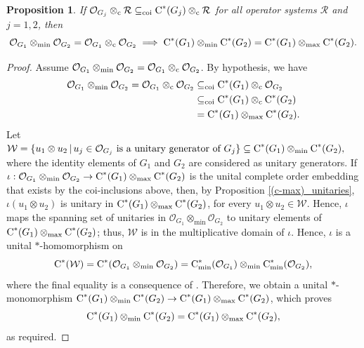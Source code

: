 \documentclass{amsart}
\newtheorem{proposition}[theorem]{Proposition}
\theoremstyle{definition}
\theoremstyle{remark}
\newcommand\omin{\otimes_{\textrm{min}}}
\newcommand\cstar{{\textrm C}^*}                              %
\newcommand\cstare{{\textrm C}_{\textrm{min}}^*}              %
\numberwithin{equation}{section}
\begin{document}
\begin{proposition}\label{rdci-(min,max)}
	If $\mathcal O_{G_j}\otimes_{\textrm c}\mathcal R\subseteq_{\textrm{coi}}\cstar(G_j)\otimes_{\textrm c}\mathcal R$ for all operator systems $\mathcal R$ and $j=1,2$, then $$\mathcal O_{G_1}\otimes_{\textrm{min}}\mathcal O_{G_2}=\mathcal O_{G_1}\otimes_{\textrm c}\mathcal O_{G_2}\implies \cstar(G_1)\otimes_{\textrm{min}}\cstar(G_2)=\cstar(G_1)\otimes_{\textrm{max}}\cstar(G_2).$$
\end{proposition}
\begin{proof}
	Assume $\mathcal O_{G_1}\otimes_{\textrm{min}}\mathcal O_{G_2}=\mathcal O_{G_1}\otimes_{\textrm c}\mathcal O_{G_2}$.  By hypothesis, we have \begin{align*}
		\mathcal O_{G_1}\otimes_{\textrm{min}}\mathcal O_{G_2}=\mathcal O_{G_1}\otimes_{\textrm c}\mathcal O_{G_2}&\subseteq_{\textrm{coi}} \cstar(G_1)\otimes_{\textrm c}\mathcal O_{G_2}\\
		&\subseteq_{\textrm{coi}} \cstar(G_1)\otimes_{\textrm c}\cstar(G_2)\\
		&=\cstar(G_1)\otimes_{\textrm{max}}\cstar(G_2).
	\end{align*} 	
Let $\mathcal W=\{u_1\otimes u_2\,|\,u_j\in\mathcal O_{G_j}\text{ is a unitary generator of }G_j\}\subseteq \cstar(G_1)\otimes_{\textrm{min}}\cstar(G_2),$
where the identity elements of $G_1$ and $G_2$ are considered as unitary generators.
If $\iota : \mathcal O_{G_1}\otimes_{\textrm{min}}\mathcal O_{G_2}\rightarrow \cstar(G_1)\otimes_{\textrm{max}}\cstar(G_2)$ is the unital complete order embedding
that exists by the coi-inclusions above, then,
by Proposition \ref{(c-max)_unitaries},
$\iota(u_1\otimes u_2)$ is unitary in $\cstar(G_1)\otimes_{\textrm{max}}\cstar(G_2)$, for every $u_1\otimes u_2\in\mathcal W$.
Hence, $\iota$ maps the spanning set of unitaries in $\mathcal O_{G_1}\otimes_{\textrm{min}}\mathcal O_{G_2}$ 
to unitary elements of $\cstar(G_1)\otimes_{\textrm{max}}\cstar(G_2)$; thus, $\mathcal W$ is in the multiplicative domain of $\iota$. 
Hence, $\iota$ is a unital $*$-homomorphism on
\[
\cstar(\mathcal W)=\cstar(\mathcal O_{G_1}\otimes_{\textrm{min}}\mathcal O_{G_2}) = \cstare(\mathcal O_{G_1})\omin \cstare(\mathcal O_{G_2}),
\]
where the final equality is a consequence of \cite[Theorem 4.4]{kavruk--paulsen--todorov--tomforde2011}. Therefore,
we obtain a unital $\ast$-monomorphism
$\cstar(G_1)\otimes_{\textrm{min}}\cstar(G_2)\rightarrow \cstar(G_1)\otimes_{\textrm{max}}\cstar(G_2)$, which proves 
\[
\cstar(G_1)\otimes_{\textrm{min}}\cstar(G_2)=\cstar(G_1)\otimes_{\textrm{max}}\cstar(G_2),
\]
as required.
\end{proof}
\end{document}
